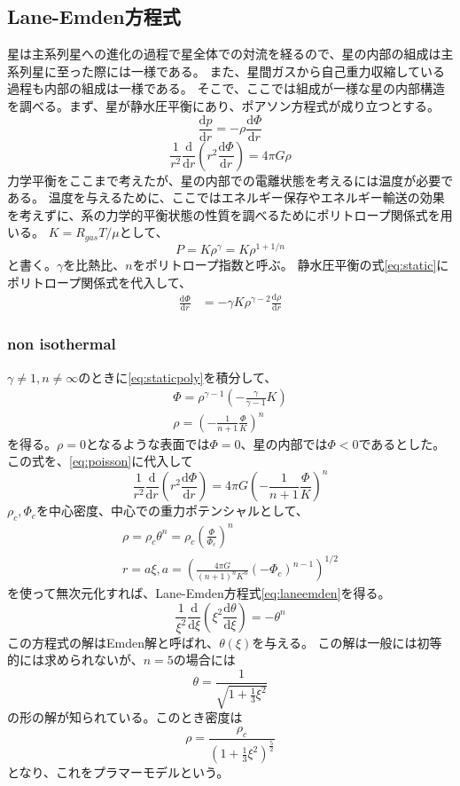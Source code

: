 \documentclass{jsarticle}
\newcommand{\dder}[2][]{\frac{\mathrm{d}#1}{\mathrm{d}#2}}
\newcommand{\beq}{\begin{equation}}
\newcommand{\eeq}{\end{equation}}
\begin{document}
\subsection{Lane-Emden方程式}
星は主系列星への進化の過程で星全体での対流を経るので、星の内部の組成は主系列星に至った際には一様である。
また、星間ガスから自己重力収縮している過程も内部の組成は一様である。
そこで、ここでは組成が一様な星の内部構造を調べる。まず、星が静水圧平衡にあり、ポアソン方程式が成り立つとする。
\begin{equation}
    \dder[p]{r} = - \rho\dder[\Phi]{r}\label{eq:static}
\end{equation}
\begin{equation}
    \frac{1}{r^2}\dder[]{r}(r^2\dder[\Phi]{r}) = 4\pi G\rho\label{eq:poisson}
\end{equation}
力学平衡をここまで考えたが、星の内部での電離状態を考えるには温度が必要である。
温度を与えるために、ここではエネルギー保存やエネルギー輸送の効果を考えずに、系の力学的平衡状態の性質を調べるためにポリトロープ関係式を用いる。
$K = R_{gas}T/\mu$として、
\begin{equation}
    P = K \rho^\gamma = K\rho^{1+1/n}\label{eq:polytropic}
\end{equation}
と書く。$\gamma$を比熱比、$n$をポリトロープ指数と呼ぶ。
静水圧平衡の式\eqref{eq:static}にポリトロープ関係式を代入して、
\begin{align}
    \dder[\Phi]{r} &= - \gamma K \rho^{\gamma -2} \dder[\rho]{r}\label{eq:staticpoly}
\end{align}
\subsubsection{non isothermal}
$\gamma \neq 1, n\neq \infty$のときに\eqref{eq:staticpoly}を積分して、
\begin{align}
    \Phi = \rho^{\gamma -1} (- \frac{\gamma}{\gamma -1}K)\\
    \rho = \left(- \frac{1}{n+1}\frac{\Phi}{K}\right)^n
\end{align}
を得る。$\rho =0$となるような表面では$\Phi=0$、星の内部では$\Phi < 0$であるとした。
この式を、\eqref{eq:poisson}に代入して
\begin{equation}
    \frac{1}{r^2}\dder[]{r}(r^2\dder[\Phi]{r}) = 4\pi G\left(- \frac{1}{n+1}\frac{\Phi}{K}\right)^n
\end{equation}
$\rho_c,\Phi_c$を中心密度、中心での重力ポテンシャルとして、
\begin{align}
    \rho = \rho_c \theta^n = \rho_c (\frac{\Phi}{\Phi_c})^n\\
r = a\xi, a = \left(\frac{4\pi G}{(n+1)^n K^n}(-\Phi_c)^{n-1}\right)^{1/2}
\end{align}
を使って無次元化すれば、Lane-Emden方程式\eqref{eq:laneemden}を得る。
\begin{equation}
    \frac{1}{\xi^2}\dder[]{\xi}\left(\xi^2\dder[\theta]{\xi}\right) = - \theta^n\label{eq:laneemden}
\end{equation}
この方程式の解はEmden解と呼ばれ、$\theta(\xi)$を与える。
この解は一般には初等的には求められないが、$n=5$の場合には
\beq
\theta = \frac{1}{\sqrt{1 + \frac{1}{3}\xi^2}}
\eeq
の形の解が知られている。このとき密度は
\beq
\rho =  \frac{\rho_c}{(1 + \frac{1}{3}\xi^2)^\frac{5}{2}}
\eeq
となり、これをプラマーモデルという。
\end{document}
